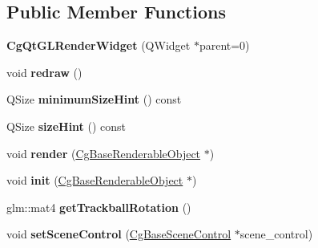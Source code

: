 \subsection*{Public Member Functions}
\begin{DoxyCompactItemize}
\item 
\mbox{\label{class_cg_qt_g_l_render_widget_a8559c5da3a46f6c138a4768a20487d20}} 
{\bfseries Cg\+Qt\+G\+L\+Render\+Widget} (Q\+Widget $\ast$parent=0)
\item 
\mbox{\label{class_cg_qt_g_l_render_widget_af11b3d116b0cd81b13f96e38022dd0f2}} 
void {\bfseries redraw} ()
\item 
\mbox{\label{class_cg_qt_g_l_render_widget_ac3d893097373a9a9e17e40750c25bd38}} 
Q\+Size {\bfseries minimum\+Size\+Hint} () const
\item 
\mbox{\label{class_cg_qt_g_l_render_widget_aff335fed3983e2403695f0a2b22c92cd}} 
Q\+Size {\bfseries size\+Hint} () const
\item 
\mbox{\label{class_cg_qt_g_l_render_widget_a5cc74a80d474f6c7ed7f0150647ceb9e}} 
void {\bfseries render} (\hyperlink{class_cg_base_renderable_object}{Cg\+Base\+Renderable\+Object} $\ast$)
\item 
\mbox{\label{class_cg_qt_g_l_render_widget_ac1e4f2c7523c01126f8b2ff63697913a}} 
void {\bfseries init} (\hyperlink{class_cg_base_renderable_object}{Cg\+Base\+Renderable\+Object} $\ast$)
\item 
\mbox{\label{class_cg_qt_g_l_render_widget_afbbb4f7a0dae8c9df073a8aaccf349db}} 
glm\+::mat4 {\bfseries get\+Trackball\+Rotation} ()
\item 
\mbox{\label{class_cg_qt_g_l_render_widget_aabefadaa6871fb0b2f0fcb8f31136b20}} 
void {\bfseries set\+Scene\+Control} (\hyperlink{class_cg_base_scene_control}{Cg\+Base\+Scene\+Control} $\ast$scene\+\_\+control)
\item 
\mbox{\label{class_cg_qt_g_l_render_widget_a8582ebcbb59437c629b4f747f2287db1}} 

\end{DoxyCompactItemize}
